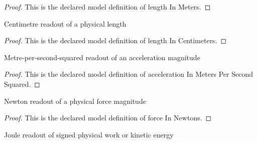 \begin{proof}
  This is the declared model definition of length In Meters.
\end{proof}
\begin{definition}
  \label{def:physics:phyx-mini-0808:phyxminiproblems-problemphyxmini0808-lengthincentimeters}
  Centimetre readout of a physical length
\end{definition}
\begin{proof}
  This is the declared model definition of length In Centimeters.
\end{proof}
\begin{definition}
  \label{def:physics:phyx-mini-0808:phyxminiproblems-problemphyxmini0808-accelerationinmeterspersecondsquared}
  Metre-per-second-squared readout of an acceleration magnitude
\end{definition}
\begin{proof}
  This is the declared model definition of acceleration In Meters Per Second Squared.
\end{proof}
\begin{definition}
  \label{def:physics:phyx-mini-0808:phyxminiproblems-problemphyxmini0808-forceinnewtons}
  Newton readout of a physical force magnitude
\end{definition}
\begin{proof}
  This is the declared model definition of force In Newtons.
\end{proof}
\begin{definition}
  \label{def:physics:phyx-mini-0808:phyxminiproblems-problemphyxmini0808-energyinjoules}
  Joule readout of signed physical work or kinetic energy
\end{definition}
